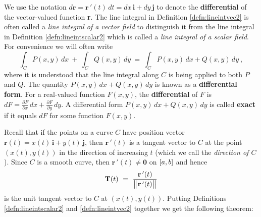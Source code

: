 We use the notation $d\textbf{r} = \textbf{r}\,'(t)\,dt = dx\,\textbf{i} + dy\,\textbf{j}$ to
denote the \textbf{differential}
of the vector-valued function \textbf{r}. The line integral in Definition \ref{defn:lineintvec2} is
often called a \emph{line integral of a vector field} to distinguish it from the line integral in
Definition \ref{defn:lineintscalar2} which is called a \emph{line integral of a scalar field}. For
convenience we will often write
\begin{displaymath}
 \int_C P(x,y)\,dx ~+~ \int_C Q(x,y)\,dy ~=~ \int_C P(x,y)\,dx + Q(x,y)\,dy ~,
\end{displaymath}
where it is understood that the line integral along $C$ is being applied to both $P$ and $Q$.
The quantity $P(x,y)\,dx + Q(x,y)\,dy$ is known as a \textbf{differential form}. For a
real-valued function $F(x,y)$, the \textbf{differential} of $F$ is $dF = \frac{\partial F}{\partial x}\,dx +
\frac{\partial F}{\partial y}\,dy$. A differential form $P(x,y)\,dx + Q(x,y)\,dy$ is called \textbf{exact} if it equals $dF$ for some function $F(x,y)$.

Recall that if the points on a curve $C$ have position vector $\textbf{r}(t) = x(t)\,\textbf{i} + y(t)\,\textbf{j}$,
then $\textbf{r}\,'(t)$ is a tangent vector to $C$ at the point $(x(t),y(t))$ in the direction of increasing $t$
(which we call the \emph{direction of $C$}). Since $C$ is a smooth curve, then $\textbf{r}\,'(t) \ne \textbf{0}$ on
$\lbrack a,b \rbrack$ and hence
\begin{displaymath}
 \textbf{T}(t) ~=~ \frac{\textbf{r}\,'(t)}{\bigl\lVert\mspace{1mu}\textbf{r}\,'(t)\mspace{1mu}\bigr\rVert}
\end{displaymath}
is the unit tangent vector to $C$ at $(x(t),y(t))$. Putting Definitions \ref{defn:lineintscalar2} and
\ref{defn:lineintvec2} together we get the following theorem:

